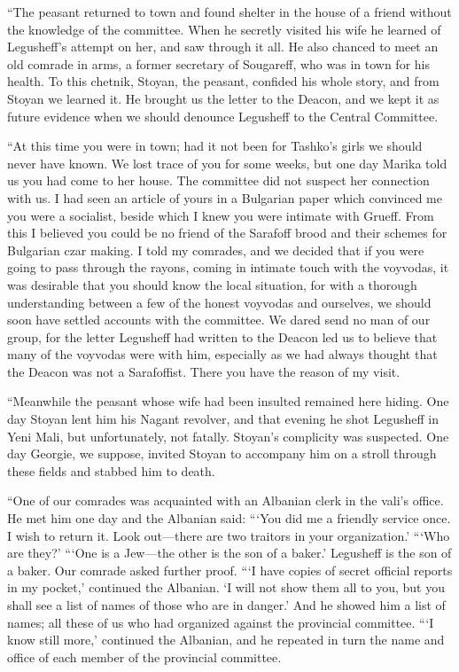 \documentclass[a5paper,12pt]{book}
\begin{document}
“The peasant returned to town and found shelter in the house of a friend without the knowledge of the committee. When he secretly visited his wife he learned of Legusheff’s attempt on her, and saw through it all. He also chanced to meet an old comrade in arms, a former secretary of Sougareff, who was in town for his health. To this chetnik, Stoyan, the peasant, confided his whole story, and from Stoyan we learned it. He brought us the letter to the Deacon, and we kept it as future evidence when we should denounce Legusheff to the Central Committee.

“At this time you were in town; had it not been for Tashko’s girls we should never have known. We lost trace of you for some weeks, but one day Marika told us you had come to her house. The committee did not suspect her connection with us. I had seen an article of yours in a Bulgarian paper which convinced me you were a socialist, beside which I knew you were intimate with Grueff. From this I believed you could be no friend of the Sarafoff brood and their schemes for Bulgarian czar making. I told my comrades, and we decided that if you were going to pass through the rayons, coming in intimate touch with the voyvodas, it was desirable that you should know the local situation, for with a thorough understanding between a few of the honest voyvodas and ourselves, we should soon have settled accounts with the committee. We dared send no man of our group, for the letter Legusheff had written to the Deacon led us to believe that many of the voyvodas were with him, especially as we had always thought that the Deacon was not a Sarafoffist. There you have the reason of my visit.

“Meanwhile the peasant whose wife had been insulted remained here hiding. One day Stoyan lent him his Nagant revolver, and that evening he shot Legusheff in Yeni Mali, but unfortunately, not fatally. Stoyan’s complicity was suspected. One day Georgie, we suppose, invited Stoyan to accompany him on a stroll through these fields and stabbed him to death.

“One of our comrades was acquainted with an Albanian clerk in the vali’s office. He met him one day and the Albanian said: “‘You did me a friendly service once. I wish to return it. Look out—there are two traitors in your organization.’ “‘Who are they?’ “‘One is a Jew—the other is the son of a baker.’ Legusheff is the son of a baker. Our comrade asked further proof. “‘I have copies of secret official reports in my pocket,’ continued the Albanian. ‘I will not show them all to you, but you shall see a list of names of those who are in danger.’ And he showed him a list of names; all these of us who had organized against the provincial committee. “‘I know still more,’ continued the Albanian, and he repeated in turn the name and office of each member of the provincial committee.
\end{document}
